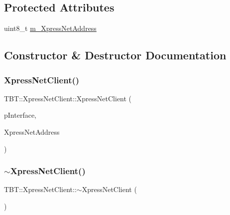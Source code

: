 \subsection*{Protected Attributes}
\begin{DoxyCompactItemize}
\item 
uint8\+\_\+t \hyperlink{classTBT_1_1XpressNetClient_a9af9cd4bed2191d7504b8ae480182643_a9af9cd4bed2191d7504b8ae480182643}{m\+\_\+\+Xpress\+Net\+Address}
\end{DoxyCompactItemize}


\subsection{Constructor \& Destructor Documentation}
\mbox{\label{classTBT_1_1XpressNetClient_a7647a4b5b68c29a2ed7d8832b6d1b692_a7647a4b5b68c29a2ed7d8832b6d1b692}} 
\subsubsection{\texorpdfstring{Xpress\+Net\+Client()}{XpressNetClient()}}
{\footnotesize\ttfamily T\+B\+T\+::\+Xpress\+Net\+Client\+::\+Xpress\+Net\+Client (\begin{DoxyParamCaption}\item[{\hyperlink{classTBT_1_1ClientInterface}{Client\+Interface} $\ast$}]{p\+Interface,  }\item[{uint8\+\_\+t}]{Xpress\+Net\+Address }\end{DoxyParamCaption})}

\mbox{\label{classTBT_1_1XpressNetClient_a6c8fe1f6815ddbf26141d3ed7cdb072c_a6c8fe1f6815ddbf26141d3ed7cdb072c}} 
\subsubsection{\texorpdfstring{$\sim$\+Xpress\+Net\+Client()}{~XpressNetClient()}}
{\footnotesize\ttfamily T\+B\+T\+::\+Xpress\+Net\+Client\+::$\sim$\+Xpress\+Net\+Client (\begin{DoxyParamCaption}{ }\end{DoxyParamCaption})\hspace{0.3cm}{\ttfamily [virtual]}}



